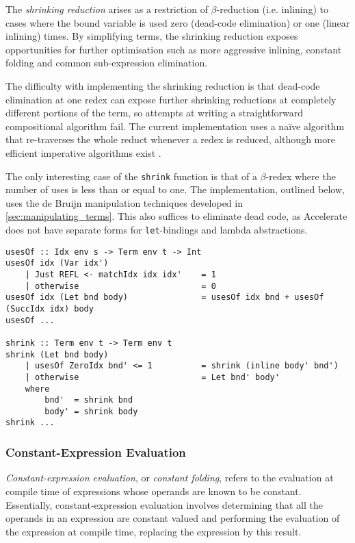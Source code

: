 The \emph{shrinking reduction} arises as a restriction of $\beta$-reduction
(i.e. inlining) to cases where the bound variable is used zero (dead-code
elimination) or one (linear inlining) times. By simplifying terms,
the shrinking reduction exposes opportunities for further optimisation such as
more aggressive inlining, constant folding and common sub-expression
elimination. %

The difficulty with implementing the shrinking reduction is that dead-code
elimination at one redex can expose further shrinking reductions at completely
different portions of the term, so attempts at writing a straightforward
compositional algorithm fail. The current implementation uses a na\"ive
algorithm that re-traverses the whole reduct whenever a redex is reduced,
although more efficient imperative algorithms exist
\cite{Appel:1997gs,Benton:2004ua,Kennedy:2007cb}.

The only interesting case of the \texttt{shrink} function is that of a
$\beta$-redex where the number of uses is less than or equal to one. The
implementation, outlined below, uses the de Bruijn manipulation techniques
developed in \autoref{sec:manipulating_terms}. This also suffices to eliminate
dead code, as Accelerate does not have separate forms for \texttt{let}-bindings
and lambda abstractions.
%
\begin{lstlisting}[style=Haskell,caption={The shrinking reduction}]
usesOf :: Idx env s -> Term env t -> Int
usesOf idx (Var idx')
    | Just REFL <- matchIdx idx idx'    = 1
    | otherwise                         = 0
usesOf idx (Let bnd body)               = usesOf idx bnd + usesOf (SuccIdx idx) body
usesOf ...

shrink :: Term env t -> Term env t
shrink (Let bnd body)
    | usesOf ZeroIdx bnd' <= 1          = shrink (inline body' bnd')
    | otherwise                         = Let bnd' body'
    where
        bnd'  = shrink bnd
        body' = shrink body
shrink ...
\end{lstlisting}


\subsubsection{Constant-Expression Evaluation}

\emph{Constant-expression evaluation}, or \emph{constant folding}, refers to the
evaluation at compile time of expressions whose operands are known to be
constant. Essentially, constant-expression evaluation involves determining that
all the operands in an expression are constant valued and performing the
evaluation of the expression at compile time, replacing the expression by this
result.

